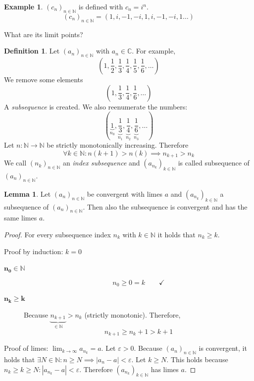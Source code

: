 \documentclass[a4paper,landscape,twocolumn]{article}
\theoremstyle{definition}
\newtheorem{defi}{Definition}
\newtheorem{ex}{Example}
\newtheorem{lemma}{Lemma}
\newcommand\abs[1]{\left|#1\right|}
\newcommand\seq[1]{{\left(#1\right)}_{n \in \mathbb N}}
\begin{document}
\begin{ex}
  $\seq{c_n}$ is defined with $c_n = i^n$.
  \[ \seq{c_n} = (1, i, -1, -i, 1, i, -1, -i, 1 \dots) \]

  What are its limit points?
\end{ex}

\begin{defi}
  Let $\seq{a_n}$ with $a_n \in \mathbb C$. For example,
  \[ \left(1, \frac12, \frac13, \frac14, \frac15, \frac16, \dots\right) \]
  We remove some elements
  \[ \left(1, \frac13, \frac14, \frac16, \dots\right) \]
  A \emph{subsequence} is created.
  We also reenumerate the numbers:
  \[ \left(\underbrace{1}_{n_0}, \underbrace{\frac13}_{n_1}, \underbrace{\frac14}_{n_2}, \underbrace{\frac16}_{n_3}, \dots\right) \]
  Let $n: \mathbb N \to \mathbb N$ be strictly monotonically increasing.
  Therefore
  \[ \forall k \in \mathbb N: n (k+1) > n(k) \implies n_{k+1} > n_k \]
  We call $\seq{n_k}$ an \emph{index subsequence} and $\left(a_{n_k}\right)_{k \in \mathbb N}$ is called subsequence of $\seq{a_n}$.
\end{defi}

\begin{lemma}
  Let $\seq{a_n}$ be convergent with limes $a$ and $\left(a_{n_k}\right)_{k \in \mathbb N}$ a subsequence of $\seq{a_n}$.
  Then also the subsequence is convergent and has the same limes $a$.
\end{lemma}
\begin{proof}
  For every subsequence index $n_k$ with $k \in \mathbb N$ it holds that $n_k \geq k$.

  Proof by induction: $k=0$
  \begin{description}
    \item[$\mathbf{n_0 \in \mathbb N}$] \[ n_0 \geq 0 = k \qquad\checkmark \]
    \item[$\mathbf{n_k \geq k}$]
      Because $\underbrace{n_{k+1}}_{\in \mathbb N} > n_k$ (strictly monotonic).
      Therefore,
      \[ n_{k+1} \geq n_k + 1 > k + 1 \]
  \end{description}

  Proof of limes: $\lim_{k\to\infty} a_{n_k} = a$.
  Let $\varepsilon > 0$. Because $\seq{a_n}$ is convergent, it holds that
  $\exists N \in \mathbb N: n \geq N \implies \abs{a_n - a} < \varepsilon$.
  Let $k \geq N$. This holds because $n_k \geq k \geq N: \abs{a_{n_k} - a} < \varepsilon$.
  Therefore $\left(a_{n_k}\right)_{k \in \mathbb N}$ has limes $a$.
\end{proof}
\end{document}
